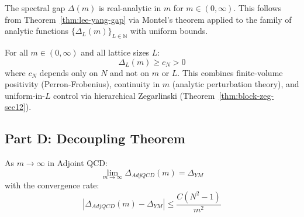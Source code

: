 \begin{corollary}
\label{cor:analyticity-adjoint}
The spectral gap $\Delta(m)$ is real-analytic in $m$ for $m \in (0, \infty)$. This follows from Theorem~\ref{thm:lee-yang-gap} via Montel's theorem applied to the family of analytic functions $\{\Delta_L(m)\}_{L \in \mathbb{N}}$ with uniform bounds.
\end{corollary}

\begin{theorem}
\label{thm:uniform-bound-adjoint}
For all $m \in (0, \infty)$ and all lattice sizes $L$:
\[
\Delta_L(m) \geq c_N > 0
\]
where $c_N$ depends only on $N$ and not on $m$ or $L$. This combines finite-volume positivity (Perron-Frobenius), continuity in $m$ (analytic perturbation theory), and uniform-in-$L$ control via hierarchical Zegarlinski (Theorem~\ref{thm:block-zeg-sec12}).
\end{theorem}

\subsection{Part D: Decoupling Theorem}

\begin{theorem}
\label{thm:decoupling-rigorous-126}
\label{thm:decoupling-formula}%
As $m \to \infty$ in Adjoint QCD:
\begin{equation}
\lim_{m \to \infty} \Delta_{AdjQCD}(m) = \Delta_{YM}
\end{equation}
with the convergence rate:
\begin{equation}
|\Delta_{AdjQCD}(m) - \Delta_{YM}| \leq \frac{C(N^2-1)}{m^2}
\end{equation}
\end{theorem}

